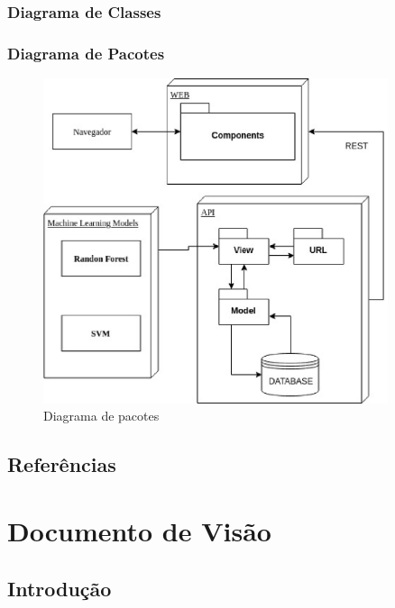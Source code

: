 \begin{anexosenv}
	\subsection{Diagrama de Classes}
	\subsection{Diagrama de Pacotes}
	\begin{figure}[!htb]
		\centering
		 \includegraphics[width=0.9\textwidth]{figuras/diagrama_pacotes.eps}
		 \caption{Diagrama de pacotes}
		 \label{diagramadepacotes}
	 \end{figure}

	\section{Referências}

% 

\chapter[Documento de Visão]{Documento de Visão}

\section{Introdução}


\end{anexosenv}
